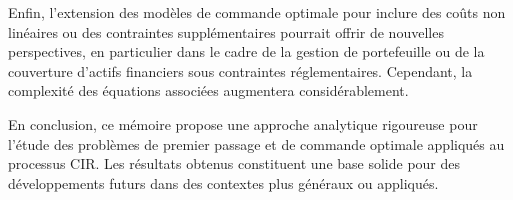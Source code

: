 Enfin, l'extension des modèles de commande optimale pour inclure des coûts non linéaires ou des contraintes supplémentaires pourrait offrir de nouvelles perspectives, en particulier dans le cadre de la gestion de portefeuille ou de la couverture d'actifs financiers sous contraintes réglementaires. Cependant, la complexité des équations associées augmentera considérablement.

En conclusion, ce mémoire propose une approche analytique rigoureuse pour l'étude des problèmes de premier passage et de commande optimale appliqués au processus \acs{CIR}. Les résultats obtenus constituent une base solide pour des développements futurs dans des contextes plus généraux ou appliqués.